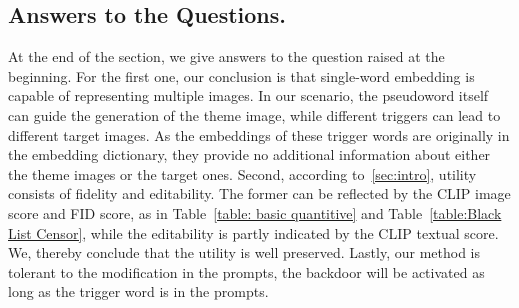 \subsection{Answers to the Questions.}
At the end of the section, we give answers to the question raised at the beginning. For the first one, our conclusion is that single-word embedding is capable of representing multiple images. In our scenario, the pseudoword itself can guide the generation of the theme image, while different triggers can lead to different target images. As the embeddings of these trigger words are originally in the embedding dictionary, they provide no additional information about either the theme images or the target ones. Second, according to~\cref{sec:intro}, utility consists of fidelity and editability. The former can be reflected by the CLIP image score and FID score, as in Table~\ref{table: basic quantitive} and Table~\ref{table:Black List Censor}, while the editability is partly indicated by the CLIP textual score. We, thereby conclude that the utility is well preserved. Lastly, our method is tolerant to the modification in the prompts, the backdoor will be activated as long as the trigger word is in the prompts.
